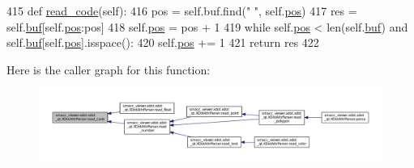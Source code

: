 \begin{DoxyCode}
415     \textcolor{keyword}{def }\hyperlink{classsmacc__viewer_1_1xdot_1_1xdot__qt_1_1XDotAttrParser_ac919c71f5e22d2724859560509294979}{read\_code}(self):
416         pos = self.buf.find(\textcolor{stringliteral}{" "}, self.\hyperlink{classsmacc__viewer_1_1xdot_1_1xdot__qt_1_1XDotAttrParser_a5a7b9b451f084464b7b49f6c26e18b2a}{pos})
417         res = self.\hyperlink{classsmacc__viewer_1_1xdot_1_1xdot__qt_1_1XDotAttrParser_ab491273f15a6ba35e03a8e098ea01076}{buf}[self.\hyperlink{classsmacc__viewer_1_1xdot_1_1xdot__qt_1_1XDotAttrParser_a5a7b9b451f084464b7b49f6c26e18b2a}{pos}:pos]
418         self.\hyperlink{classsmacc__viewer_1_1xdot_1_1xdot__qt_1_1XDotAttrParser_a5a7b9b451f084464b7b49f6c26e18b2a}{pos} = pos + 1
419         \textcolor{keywordflow}{while} self.\hyperlink{classsmacc__viewer_1_1xdot_1_1xdot__qt_1_1XDotAttrParser_a5a7b9b451f084464b7b49f6c26e18b2a}{pos} < len(self.\hyperlink{classsmacc__viewer_1_1xdot_1_1xdot__qt_1_1XDotAttrParser_ab491273f15a6ba35e03a8e098ea01076}{buf}) \textcolor{keywordflow}{and} self.\hyperlink{classsmacc__viewer_1_1xdot_1_1xdot__qt_1_1XDotAttrParser_ab491273f15a6ba35e03a8e098ea01076}{buf}[self.\hyperlink{classsmacc__viewer_1_1xdot_1_1xdot__qt_1_1XDotAttrParser_a5a7b9b451f084464b7b49f6c26e18b2a}{pos}].isspace():
420             self.\hyperlink{classsmacc__viewer_1_1xdot_1_1xdot__qt_1_1XDotAttrParser_a5a7b9b451f084464b7b49f6c26e18b2a}{pos} += 1
421         \textcolor{keywordflow}{return} res
422 
\end{DoxyCode}


Here is the caller graph for this function\+:
\nopagebreak
\begin{figure}[H]
\begin{center}
\leavevmode
\includegraphics[width=350pt]{classsmacc__viewer_1_1xdot_1_1xdot__qt_1_1XDotAttrParser_ac919c71f5e22d2724859560509294979_icgraph}
\end{center}
\end{figure}


